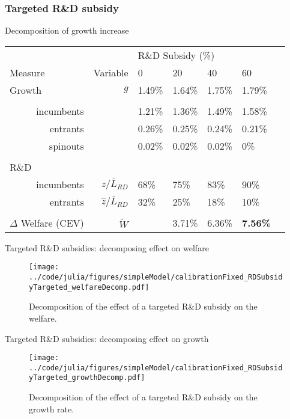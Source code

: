 \documentclass[english,usenames,dvipsnames]{beamer}
\begin{document}
\subsubsection{Targeted R\&D subsidy}

\begin{frame}{Decomposition of growth increase}\label{oi_rd_subsidies:decomposition_growth_decrease}
	\hyperlink{OI_RDsubsidy_table}{}
	\begin{table}
		\centering
		\small
		\begin{tabular}{lrlllll}
			\toprule \toprule
			&  & \multicolumn{4}{l}{R\&D Subsidy (\%)} \vspace{3pt} \tabularnewline
			Measure & Variable & 0 & 20 & 40 & 60 \tabularnewline
			\midrule
			Growth & $g$ & 1.49\% & 1.64\% & 1.75\% & 1.79\% \tabularnewline
			\tabularnewline
			\multicolumn{1}{r}{incumbents} & & 1.21\% & 1.36\% & 1.49\% & 1.58\% \tabularnewline
			\multicolumn{1}{r}{entrants} & & 0.26\% & 0.25\% & 0.24\% & 0.21\% \tabularnewline
			\multicolumn{1}{r}{spinouts} &  & 0.02\% & 0.02\% & 0.02\% & 0\% \tabularnewline
			\tabularnewline
			R\&D & &  &  &  & \tabularnewline
			\multicolumn{1}{r}{incumbents} & $z / \bar{L}_{RD}$ & 68\% & 75\% & 83\% & 90\% \tabularnewline
			\multicolumn{1}{r}{entrants} & $\hat{z} / \bar{L}_{RD}$ & 32\% & 25\% & 18\% & 10\% \tabularnewline
			\tabularnewline
			$\Delta$ Welfare (CEV) & $\tilde{W}$  &  & 3.71\% & 6.36\% & \alert{\textbf{7.56\%}} \tabularnewline
			\bottomrule
		\end{tabular}
	\end{table}
\end{frame}

\begin{frame}{Targeted R\&D subsidies: decomposing effect on welfare} \label{plots:oi_rd_subsidies1} 
	\hyperlink{OI_RDsubsidy_table}{}
	\begin{figure}[]
		\texttt{[image: ../code/julia/figures/simpleModel/calibrationFixed\_RDSubsidyTargeted\_welfareDecomp.pdf]}
		\caption{Decomposition of the effect of a targeted R\&D subsidy on the welfare.}
		\label{calibration_OI_RDSubsidy_welfareDecomp}
	\end{figure}
\end{frame}

\begin{frame}{Targeted R\&D subsidies: decomposing effect on growth} \label{plots:oi_rd_subsidies2}
	\hyperlink{OI_RDsubsidy_table}{}
	\begin{figure}[]
		\texttt{[image: ../code/julia/figures/simpleModel/calibrationFixed\_RDSubsidyTargeted\_growthDecomp.pdf]}
		\caption{Decomposition of the effect of a targeted R\&D subsidy on the growth rate.}
		\label{calibration_OI_RDSubsidy_growthDecomp}
	\end{figure}
\end{frame}
\end{document}
